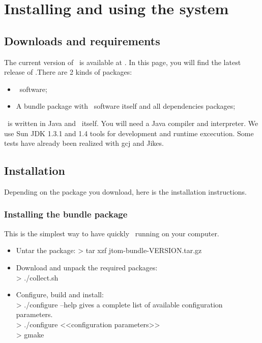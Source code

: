 \section{Installing and using the system}

\subsection{Downloads and requirements}
The current version of \TOM\ is available at
  .
In this page, you will find the latest release of \TOM.There are 2
kinds of packages:
\begin{itemize}
\item \TOM\ software;
\item A bundle package with \TOM\ software itself and all dependencies
  packages;
\end{itemize}

\TOM\ is written in Java and \TOM\ itself. You will need a Java
compiler and interpreter. 
We use Sun JDK 1.3.1 and 1.4 tools for development and runtime
excecution. Some tests have already been realized with gcj
and Jikes.
\subsection{Installation}
Depending on the package you download, here is the installation
instructions.

\subsubsection{Installing the bundle package}
This is the simplest way to have quickly \TOM\ running on your
computer.
\begin{itemize}
\item Untar the package: 
  > tar xzf jtom-bundle-VERSION.tar.gz
\item Download and unpack the required packages:
  \\> ./collect.sh
\item Configure, build and install:
  \\> ./configure --help gives a complete list of available configuration parameters.
  \\> ./configure <<configuration parameters>>
  \\> gmake
\end{itemize}

